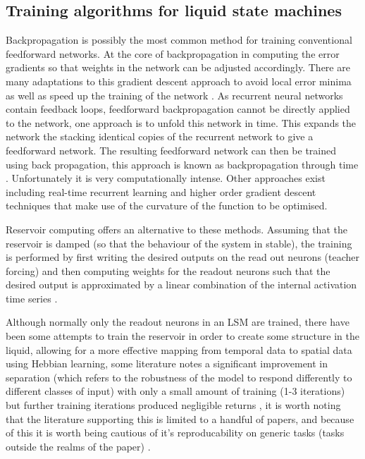 \documentclass[fleqn,12pt]{wlscirep}
\begin{document}
\subsection*{Training algorithms for liquid state machines}
Backpropagation is possibly the most common method for training conventional feedforward networks. At the core of backpropagation in computing the error gradients so that weights in the network can be adjusted accordingly. There are many adaptations to this gradient descent approach to avoid local error minima as well as speed up the training of the network 
\cite{jaeger_tutorial_nodate}
. As recurrent neural networks contain feedback loops, feedforward backpropagation cannot be directly applied to the network, one approach is to unfold this network in time. This expands the network the stacking identical copies of the recurrent network to give a feedforward network. The resulting feedforward network can then be trained using back propagation, this approach is known as backpropagation through time
\cite{jaeger_tutorial_nodate}
. Unfortunately it is very computationally intense. Other approaches exist including real-time recurrent learning and higher order gradient descent techniques that make use of the curvature of the function to be optimised.

Reservoir computing offers an alternative to these methods. Assuming that the reservoir is damped (so that the behaviour of the system in stable), the training is performed by first writing the desired outputs on the read out neurons (teacher forcing) and then computing weights for the readout neurons such that the desired output is approximated by a linear combination of the internal activation time series 
\cite{jaeger_tutorial_nodate}.

Although normally only the readout neurons in an LSM are trained, there have been some attempts to train the reservoir in order to create some structure in the liquid, allowing for a more effective mapping from temporal data to spatial data using Hebbian learning, some literature notes a significant improvement in separation (which refers to the robustness of the model to respond differently to different classes of input) with only a small amount of training (1-3 iterations) but further training iterations produced negligible returns 
\cite{norton_preparing_nodate}, it is worth noting that the literature supporting this is limited to a handful of papers, and because of this it is worth being cautious of it's reproducability on generic tasks (tasks outside the realms of the paper)
.
\end{document}
